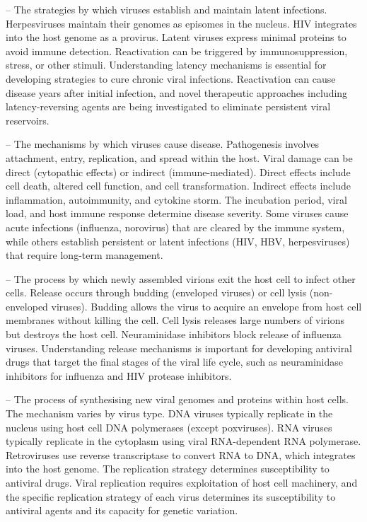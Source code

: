 -- The strategies by which viruses establish and maintain latent infections. Herpesviruses maintain their genomes as episomes in the nucleus. HIV integrates into the host genome as a provirus. Latent viruses express minimal proteins to avoid immune detection. Reactivation can be triggered by immunosuppression, stress, or other stimuli. Understanding latency mechanisms is essential for developing strategies to cure chronic viral infections. Reactivation can cause disease years after initial infection, and novel therapeutic approaches including latency-reversing agents are being investigated to eliminate persistent viral reservoirs.

-- The mechanisms by which viruses cause disease. Pathogenesis involves attachment, entry, replication, and spread within the host. Viral damage can be direct (cytopathic effects) or indirect (immune-mediated). Direct effects include cell death, altered cell function, and cell transformation. Indirect effects include inflammation, autoimmunity, and cytokine storm. The incubation period, viral load, and host immune response determine disease severity. Some viruses cause acute infections (influenza, norovirus) that are cleared by the immune system, while others establish persistent or latent infections (HIV, HBV, herpesviruses) that require long-term management.

-- The process by which newly assembled virions exit the host cell to infect other cells. Release occurs through budding (enveloped viruses) or cell lysis (non-enveloped viruses). Budding allows the virus to acquire an envelope from host cell membranes without killing the cell. Cell lysis releases large numbers of virions but destroys the host cell. Neuraminidase inhibitors block release of influenza viruses. Understanding release mechanisms is important for developing antiviral drugs that target the final stages of the viral life cycle, such as neuraminidase inhibitors for influenza and HIV protease inhibitors.

-- The process of synthesising new viral genomes and proteins within host cells. The mechanism varies by virus type. DNA viruses typically replicate in the nucleus using host cell DNA polymerases (except poxviruses). RNA viruses typically replicate in the cytoplasm using viral RNA-dependent RNA polymerase. Retroviruses use reverse transcriptase to convert RNA to DNA, which integrates into the host genome. The replication strategy determines susceptibility to antiviral drugs. Viral replication requires exploitation of host cell machinery, and the specific replication strategy of each virus determines its susceptibility to antiviral agents and its capacity for genetic variation.

